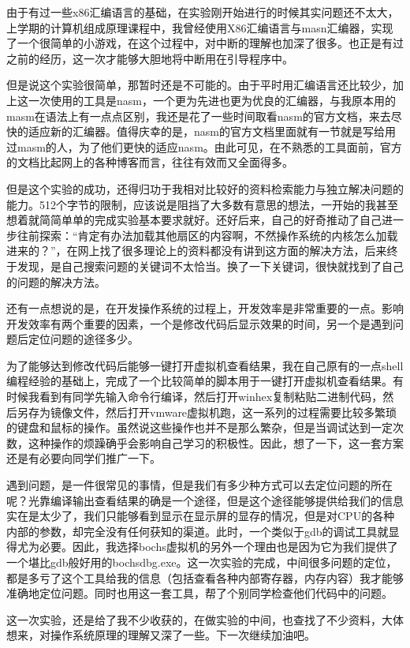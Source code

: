\documentclass[forprint]{WHUBachelor}
\begin{document}
由于有过一些x86汇编语言的基础，在实验刚开始进行的时候其实问题还不太大，上学期的计算机组成原理课程中，我曾经使用X86汇编语言与masn汇编器，实现了一个很简单的小游戏，在这个过程中，对中断的理解也加深了很多。也正是有过之前的经历，这一次才能够大胆地将中断用在引导程序中。

但是说这个实验很简单，那暂时还是不可能的。由于平时用汇编语言还比较少，加上这一次使用的工具是nasm，一个更为先进也更为优良的汇编器，与我原本用的masm在语法上有一点点区别，我还是花了一些时间取看nasm的官方文档，来去尽快的适应新的汇编器。值得庆幸的是，nasm的官方文档里面就有一节就是写给用过masm的人，为了他们更快的适应nasm。由此可见，在不熟悉的工具面前，官方的文档比起网上的各种博客而言，往往有效而又全面得多。

但是这个实验的成功，还得归功于我相对比较好的资料检索能力与独立解决问题的能力。512个字节的限制，应该说是阻挡了大多数有意思的想法，一开始的我甚至想着就简简单单的完成实验基本要求就好。还好后来，自己的好奇推动了自己进一步往前探索：“肯定有办法加载其他扇区的内容啊，不然操作系统的内核怎么加载进来的？”，在网上找了很多理论上的资料都没有讲到这方面的解决方法，后来终于发现，是自己搜索问题的关键词不太恰当。换了一下关键词，很快就找到了自己的问题的解决方法。

还有一点想说的是，在开发操作系统的过程上，开发效率是非常重要的一点。影响开发效率有两个重要的因素，一个是修改代码后显示效果的时间，另一个是遇到问题后定位问题的途径多少。

为了能够达到修改代码后能够一键打开虚拟机查看结果，我在自己原有的一点shell编程经验的基础上，完成了一个比较简单的脚本用于一键打开虚拟机查看结果。有时候我看到有同学先输入命令行编译，然后打开winhex复制粘贴二进制代码，然后另存为镜像文件，然后打开vmware虚拟机跑，这一系列的过程需要比较多繁琐的键盘和鼠标的操作。虽然说这些操作也并不是那么繁杂，但是当调试达到一定次数，这种操作的烦躁确乎会影响自己学习的积极性。因此，想了一下，这一套方案还是有必要向同学们推广一下。

遇到问题，是一件很常见的事情，但是我们有多少种方式可以去定位问题的所在呢？光靠编译输出查看结果的确是一个途径，但是这个途径能够提供给我们的信息实在是太少了，我们只能够看到显示在显示屏的显存的情况，但是对CPU的各种内部的参数，却完全没有任何获知的渠道。此时，一个类似于gdb的调试工具就显得尤为必要。因此，我选择bochs虚拟机的另外一个理由也是因为它为我们提供了一个堪比gdb般好用的bochsdbg.exe。这一次实验的完成，中间很多问题的定位，都是多亏了这个工具给我的信息（包括查看各种内部寄存器，内存内容）我才能够准确地定位问题。同时也用这一套工具，帮了个别同学检查他们代码中的问题。

这一次实验，还是给了我不少收获的，在做实验的中间，也查找了不少资料，大体想来，对操作系统原理的理解又深了一些。下一次继续加油吧。
\end{document}
